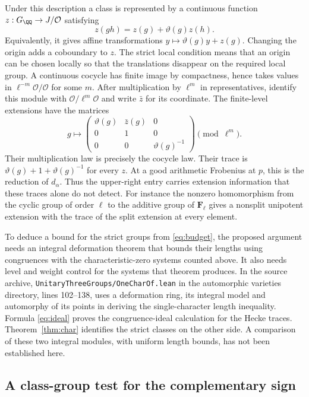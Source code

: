 \documentclass[a4paper,11pt]{article}
\theoremstyle{definition}
\theoremstyle{remark}
\numberwithin{equation}{section}
\newcommand{\OO}{\mathcal O}
\begin{document}
Under this description a class is represented by a continuous function \(z:G_\QQ\to J/\OO\) satisfying
\[
 z(gh)=z(g)+\vartheta(g)z(h).
\]
Equivalently, it gives affine transformations \(y\mapsto\vartheta(g)y+z(g)\). Changing the origin adds a coboundary to \(z\). The strict local condition means that an origin can be chosen locally so that the translations disappear on the required local group. A continuous cocycle has finite image by compactness, hence takes values in \(\ell^{-m}\OO/\OO\) for some \(m\). After multiplication by \(\ell^m\) in representatives, identify this module with \(\OO/\ell^m\OO\) and write \(\bar z\) for its coordinate. The finite-level extensions have the matrices
\[
 g\longmapsto
 \begin{pmatrix}
  \vartheta(g)&\bar z(g)&0\\
  0&1&0\\
  0&0&\vartheta(g)^{-1}
 \end{pmatrix}\pmod{\ell^m}.
\]
Their multiplication law is precisely the cocycle law. Their trace is \(\vartheta(g)+1+\vartheta(g)^{-1}\) for every \(z\). At a good arithmetic Frobenius at \(p\), this is the reduction of \(d_\alpha\). Thus the upper-right entry carries extension information that these traces alone do not detect. For instance the nonzero homomorphism from the cyclic group of order \(\ell\) to the additive group of \(\mathbf F_\ell\) gives a nonsplit unipotent extension with the trace of the split extension at every element.

To deduce a bound for the strict groups from \eqref{eq:budget}, the proposed argument needs an integral deformation theorem that bounds their lengths using congruences with the characteristic-zero systems counted above. It also needs level and weight control for the systems that theorem produces. In the source archive, \nolinkurl{UnitaryThreeGroups/OneCharOf.lean} in the automorphic varieties directory, lines 102--138, uses a deformation ring, its integral model and automorphy of its points in deriving the single-character length inequality. Formula \eqref{eq:ideal} proves the congruence-ideal calculation for the Hecke traces. Theorem~\ref{thm:char} identifies the strict classes on the other side. A comparison of these two integral modules, with uniform length bounds, has not been established here.

\subsection{A class-group test for the complementary sign}\label{nav:III-03}
\label{sec:reflect}
\end{document}
